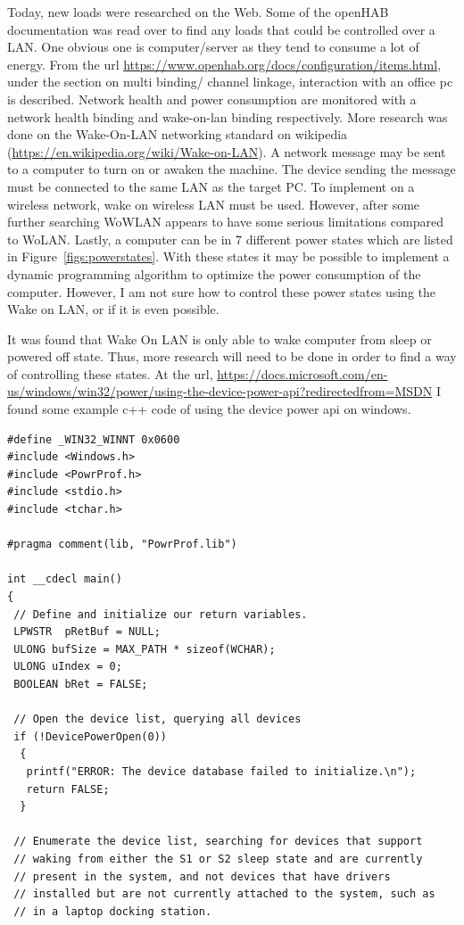 \documentclass[fontsize=11pt, %
                             paper=letter, %
                             twoside, %
                             captions=tableheading,
                             index=totoc,
                             hyperref]{labbook}
\begin{document}
\begin{addmargin}[0cm]{0cm}
Today, new loads were researched on the Web. Some of the openHAB documentation was read over to find any loads that could be controlled over a LAN. One obvious one is computer/server as they tend to consume a lot of energy. From the url \url{https://www.openhab.org/docs/configuration/items.html}, under the section on multi binding/ channel linkage, interaction with an office pc is described. Network health and power consumption are monitored with a network health binding and wake-on-lan binding respectively.
\smallbreak\noindent
More research was done on the Wake-On-LAN networking standard on wikipedia (\url{https://en.wikipedia.org/wiki/Wake-on-LAN}). A network message may be sent to a computer to turn on or awaken the machine. The device sending the message must be connected to the same LAN as the target PC. To implement on a wireless network, wake on wireless LAN must be used. However, after some further searching WoWLAN appears to have some serious limitations compared to WoLAN. Lastly, a computer can be in 7 different power states which are listed in Figure~\ref{figs:powerstates}.
With these states it may be possible to implement a dynamic programming algorithm to optimize the power consumption of the computer. However, I am not sure how to control these power states using the Wake on LAN, or if it is even possible.

It was found that Wake On LAN is only able to wake computer from sleep or powered off state. Thus, more research will need to be done in order to find a way of controlling these states. At the url, \url{https://docs.microsoft.com/en-us/windows/win32/power/using-the-device-power-api?redirectedfrom=MSDN} I found some example c++ code of using the device power api on windows.

\begin{Verbatim}[tabsize=4]
#define _WIN32_WINNT 0x0600
#include <Windows.h>
#include <PowrProf.h>
#include <stdio.h>
#include <tchar.h>

#pragma comment(lib, "PowrProf.lib")

int __cdecl main()
{
 // Define and initialize our return variables.
 LPWSTR  pRetBuf = NULL;
 ULONG bufSize = MAX_PATH * sizeof(WCHAR);
 ULONG uIndex = 0;
 BOOLEAN bRet = FALSE;

 // Open the device list, querying all devices
 if (!DevicePowerOpen(0)) 
  {
   printf("ERROR: The device database failed to initialize.\n");
   return FALSE;
  }

 // Enumerate the device list, searching for devices that support 
 // waking from either the S1 or S2 sleep state and are currently 
 // present in the system, and not devices that have drivers 
 // installed but are not currently attached to the system, such as 
 // in a laptop docking station.


\end{Verbatim}
\end{addmargin}
\end{document}
